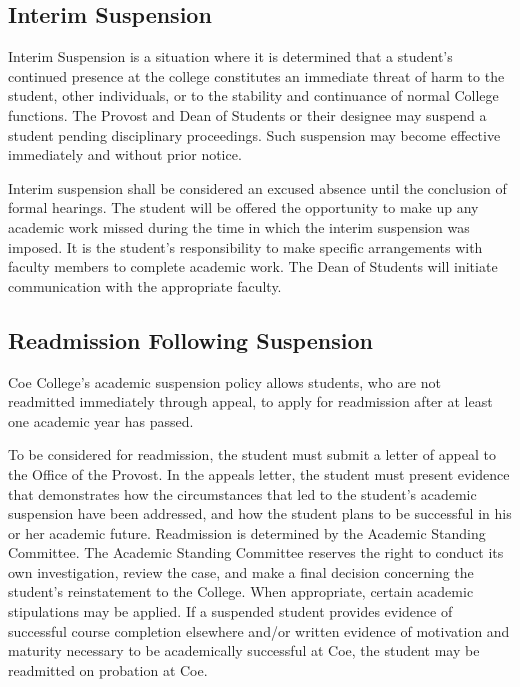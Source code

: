\documentclass[
  letterpaper,
]{scrbook}
\begin{document}
\subsection{Interim Suspension}\label{interim-suspension}

Interim Suspension is a situation where it is determined that a
student's continued presence at the college constitutes an immediate
threat of harm to the student, other individuals, or to the stability
and continuance of normal College functions. The Provost and Dean of
Students or their designee may suspend a student pending disciplinary
proceedings. Such suspension may become effective immediately and
without prior notice.

Interim suspension shall be considered an excused absence until the
conclusion of formal hearings. The student will be offered the
opportunity to make up any academic work missed during the time in which
the interim suspension was imposed. It is the student's responsibility
to make specific arrangements with faculty members to complete academic
work. The Dean of Students will initiate communication with the
appropriate faculty.

\subsection{Readmission Following
Suspension}\label{readmission-following-suspension}

Coe College's academic suspension policy allows students, who are not
readmitted immediately through appeal, to apply for readmission after at
least one academic year has passed.

To be considered for readmission, the student must submit a letter of
appeal to the Office of the Provost. In the appeals letter, the student
must present evidence that demonstrates how the circumstances that led
to the student's academic suspension have been addressed, and how the
student plans to be successful in his or her academic future.
Readmission is determined by the Academic Standing Committee. The
Academic Standing Committee reserves the right to conduct its own
investigation, review the case, and make a final decision concerning the
student's reinstatement to the College. When appropriate, certain
academic stipulations may be applied. If a suspended student provides
evidence of successful course completion elsewhere and/or written
evidence of motivation and maturity necessary to be academically
successful at Coe, the student may be readmitted on probation at Coe.
\end{document}
